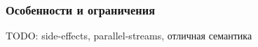 \begin{frame}
\frametitle{Особенности и ограничения}
TODO: side-effects, parallel-streams, отличная семантика
\end{frame}
